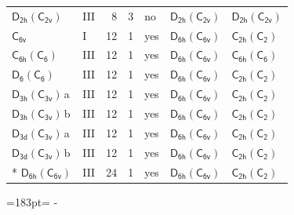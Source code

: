 \documentclass[10pt,a4paper]{article}
\newcommand{\needspace}[1]{\par\penalty-100\begingroup\dimen0=#1\relax\dimen2=\pagegoal
  \advance\dimen2-\pagetotal\ifdim\dimen0>\dimen2\relax\ifdim\dimen2>0pt\vfil\break\fi\fi
  \endgroup}
\numberwithin{equation}{section}
\newcommand{\grp}[1]{\mathsf{#1}}
\newcommand{\clsletter}[1]{\,{\scriptsize\color{black!55}#1}}
\begin{document}
{\begin{longtable}{@{}llrrlll@{}}
\href{D2h-C2v.pdf}{$\grp{D_{2h}}(\grp{C_{2v}})$} & III & 8 & 3 & no & \href{D2h-C2v.pdf}{$\grp{D_{2h}}(\grp{C_{2v}})$} & \href{D2h-C2v.pdf}{$\grp{D_{2h}}(\grp{C_{2v}})$}\\
\href{../../../rotation/data/pdf/C6v.pdf}{$\grp{C_{6v}}$} & I & 12 & 1 & yes & \href{D6h-C6v.pdf}{$\grp{D_{6h}}(\grp{C_{6v}})$} & \href{C2h-C2.pdf}{$\grp{C_{2h}}(\grp{C_{2}})$}\\
\href{C6h-C6.pdf}{$\grp{C_{6h}}(\grp{C_{6}})$} & III & 12 & 1 & yes & \href{D6h-C6v.pdf}{$\grp{D_{6h}}(\grp{C_{6v}})$} & \href{C6h-C6.pdf}{$\grp{C_{6h}}(\grp{C_{6}})$}\\
\href{D6-C6.pdf}{$\grp{D_{6}}(\grp{C_{6}})$} & III & 12 & 1 & yes & \href{D6h-C6v.pdf}{$\grp{D_{6h}}(\grp{C_{6v}})$} & \href{C2h-C2.pdf}{$\grp{C_{2h}}(\grp{C_{2}})$}\\
\href{D3h-C3v.pdf}{$\grp{D_{3h}}(\grp{C_{3v}})$}\clsletter{a} & III & 12 & 1 & yes & \href{D6h-C6v.pdf}{$\grp{D_{6h}}(\grp{C_{6v}})$} & \href{C2h-C2.pdf}{$\grp{C_{2h}}(\grp{C_{2}})$}\\
\href{D3h-C3v.pdf}{$\grp{D_{3h}}(\grp{C_{3v}})$}\clsletter{b} & III & 12 & 1 & yes & \href{D6h-C6v.pdf}{$\grp{D_{6h}}(\grp{C_{6v}})$} & \href{C2h-C2.pdf}{$\grp{C_{2h}}(\grp{C_{2}})$}\\
\href{D3d-C3v.pdf}{$\grp{D_{3d}}(\grp{C_{3v}})$}\clsletter{a} & III & 12 & 1 & yes & \href{D6h-C6v.pdf}{$\grp{D_{6h}}(\grp{C_{6v}})$} & \href{C2h-C2.pdf}{$\grp{C_{2h}}(\grp{C_{2}})$}\\
\href{D3d-C3v.pdf}{$\grp{D_{3d}}(\grp{C_{3v}})$}\clsletter{b} & III & 12 & 1 & yes & \href{D6h-C6v.pdf}{$\grp{D_{6h}}(\grp{C_{6v}})$} & \href{C2h-C2.pdf}{$\grp{C_{2h}}(\grp{C_{2}})$}\\*
\href{D6h-C6v.pdf}{$\grp{D_{6h}}(\grp{C_{6v}})$} & III & 24 & 1 & yes & \href{D6h-C6v.pdf}{$\grp{D_{6h}}(\grp{C_{6v}})$} & \href{C2h-C2.pdf}{$\grp{C_{2h}}(\grp{C_{2}})$}\\
\bottomrule\end{longtable}}
\needspace{183pt}
\end{document}
